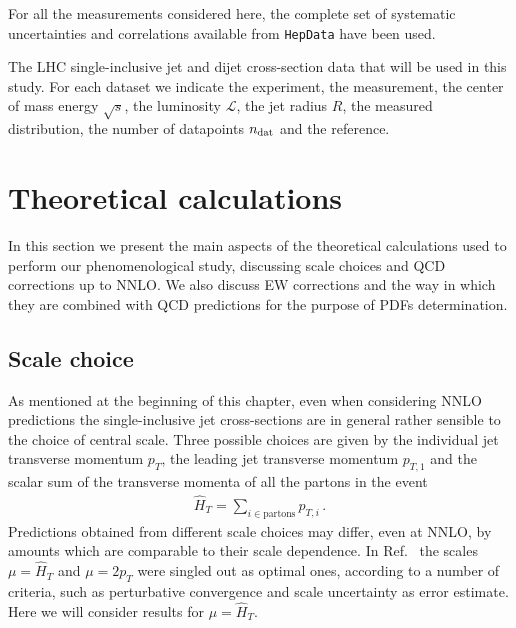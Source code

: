 %
For all the measurements considered here, the complete set of systematic uncertainties and correlations available from
{\tt HepData} have been used.

\begin{table}[!t]
    \centering
    \scriptsize
    \renewcommand{\arraystretch}{1.90}
    
    \vspace{0.3cm}
    \caption{\small The LHC single-inclusive jet and dijet cross-section data
       that will be used  in this study. For each dataset we indicate the experiment,
       the measurement, the center of mass energy $\sqrt{s}$, the luminosity 
       $\mathcal{L}$, the jet radius $R$, the measured distribution, the number of 
       datapoints $n_{\rm dat}$ and the reference.}
    \label{tab:input_datasets}
\end{table}
    


\section{Theoretical calculations}
\label{sec:jets_th}
In this section we present the main aspects of the theoretical calculations used to perform
our phenomenological study, discussing scale choices and QCD corrections up to NNLO.
We also discuss EW corrections and the way in which they are combined with QCD predictions for the 
purpose of PDFs determination.

\subsection{Scale choice}
As mentioned at the beginning of this chapter, even when considering NNLO predictions
the single-inclusive jet cross-sections are in general
rather sensible to the choice of central scale.
Three possible choices are given by the individual jet transverse momentum $p_T$, 
the leading jet transverse momentum $p_{T,1}$ and the scalar sum of the transverse momenta of all the partons
in the event 
\begin{align}
    \hat{H}_T = \sum_{i\in\text{partons}} p_{T,i}\,.
\end{align}
Predictions obtained from different scale choices may differ, even at NNLO, by amounts which are comparable to their
scale dependence.
In Ref.~\cite{Currie:2018xkj} the scales $\mu = \hat{H}_T $ and $\mu = 2p_T$ were singled out as optimal ones,
according to a number of criteria, such as perturbative convergence and scale uncertainty as error estimate.
Here we will consider results for $\mu = \hat{H}_T$. 

